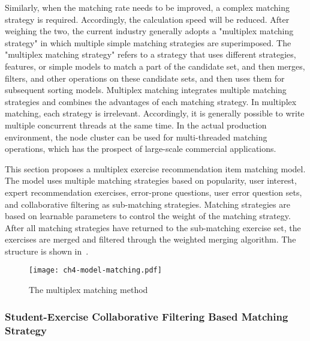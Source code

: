 Similarly, when the matching rate needs to be improved, a complex matching strategy is required. Accordingly, the calculation speed will be reduced. After weighing the two, the current industry generally adopts a "multiplex matching strategy" in which multiple simple matching strategies are superimposed. The "multiplex matching strategy" refers to a strategy that uses different strategies, features, or simple models to match a part of the candidate set, and then merges, filters, and other operations on these candidate sets, and then uses them for subsequent sorting models. Multiplex matching integrates multiple matching strategies and combines the advantages of each matching strategy. In multiplex matching, each strategy is irrelevant. Accordingly, it is generally possible to write multiple concurrent threads at the same time. In the actual production environment, the node cluster can be used for multi-threaded matching operations, which has the prospect of large-scale commercial applications.

This section proposes a multiplex exercise recommendation item matching model. The model uses multiple matching strategies based on popularity, user interest, expert recommendation exercises, error-prone questions, user error question sets, and collaborative filtering as sub-matching strategies. Matching strategies are based on learnable parameters to control the weight of the matching strategy. After all matching strategies have returned to the sub-matching exercise set, the exercises are merged and filtered through the weighted merging algorithm. The structure is shown in~\figname{\ref{fig:ch4-matching}}.

\begin{figure}[htbp!]
    \centering
    \texttt{[image: ch4-model-matching.pdf]}
    \caption{The multiplex matching method}\label{fig:ch4-matching}
\end{figure}

\subsubsection{Student-Exercise Collaborative Filtering Based Matching Strategy}

